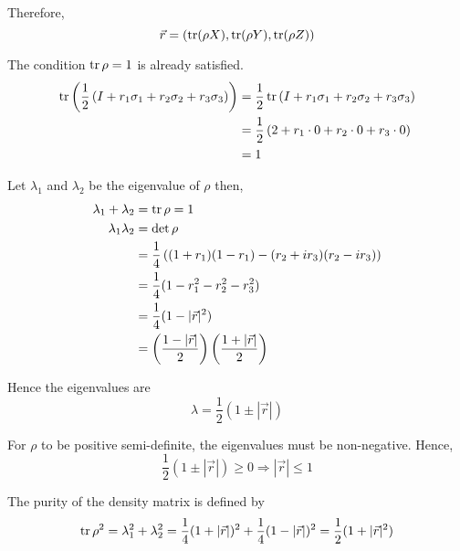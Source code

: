 \documentclass[a4paper,11pt]{article}
\begin{document}
Therefore,
\begin{equation}
    \vec{r}=\left(\operatorname{tr}(\rho X), \operatorname{tr}(\rho Y), \operatorname{tr}(\rho Z)\right)
\end{equation}

The condition $\operatorname{tr}\rho=1$ is already satisfied.
\begin{align}
    \operatorname{tr}\left(\frac{1}{2}\left(I + r_1\sigma_1+r_2\sigma_2+r_3\sigma_3\right)\right)
    &=\frac{1}{2}\operatorname{tr}\left(I + r_1\sigma_1+r_2\sigma_2+r_3\sigma_3\right) \\
    &=\frac{1}{2}\left(2 + r_1\cdot 0+r_2\cdot 0+r_3\cdot 0\right) \\
    &=1
\end{align}

Let $\lambda_1$ and $\lambda_2$ be the eigenvalue of $\rho$ then,
\begin{align}
    \lambda_1 + \lambda_2 &= \operatorname{tr}\rho = 1\\
    \lambda_1\lambda_2&=\det\rho\\
    &=\frac{1}{4}\left((1+r_1)(1-r_1)-(r_2+ir_3)(r_2-ir_3)\right)\\
    &=\frac{1}{4}(1-r_1^2-r_2^2-r_3^2)\\
    &=\frac{1}{4}(1-|\vec r|^2)\\
    &=\left(\frac{1-|\vec{r}|}{2}\right)\left(\frac{1+|\vec{r}|}{2}\right)
\end{align}

Hence the eigenvalues are
\begin{equation}
    \lambda=\frac{1}{2}(1\pm|\vec{r}|)
\end{equation}

For $\rho$ to be positive semi-definite, the eigenvalues must be non-negative. Hence,
\begin{equation}
   \frac{1}{2}(1\pm|\vec{r}|)\geq 0\Rightarrow |\vec{r}| \leq 1 
\end{equation}

The purity of the density matrix is defined by
\begin{equation}
    \operatorname{tr}\rho^2=\lambda_1^2+\lambda_2^2=\frac{1}{4}(1+|\vec r|)^2+\frac{1}{4}(1-|\vec r|)^2=\frac{1}{2}(1+|\vec r|^2)
\end{equation}
\end{document}

